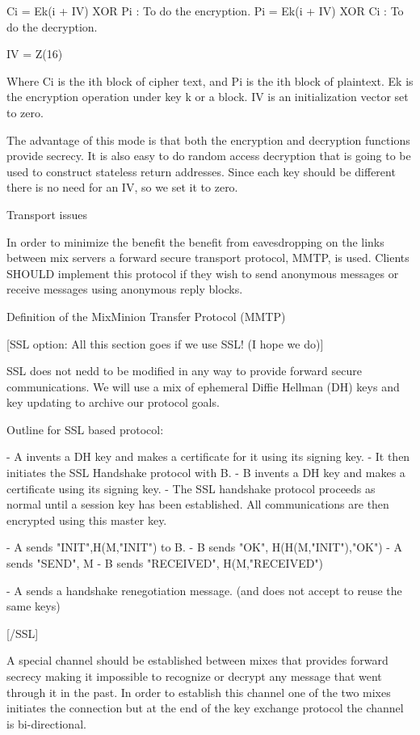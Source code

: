 Ci = Ek(i + IV) XOR Pi  : To do the encryption.
Pi = Ek(i + IV) XOR Ci  : To do the decryption.

IV = Z(16)

Where Ci is the ith block of cipher text, and Pi is the ith block of
plaintext. Ek is the encryption operation under key k or a block. IV
is an initialization vector set to zero.

The advantage of this mode is that both the encryption and decryption
functions provide secrecy. It is also easy to do random access
decryption that is going to be used to construct stateless return
addresses. Since each key should be different there is no need for an
IV, so we set it to zero. 

Transport issues

In order to minimize the benefit the benefit from eavesdropping on the links 
between mix servers a forward secure transport protocol, MMTP, is used. 
Clients SHOULD implement this protocol if they wish to send anonymous 
messages or receive messages using anonymous reply blocks.

Definition of the MixMinion Transfer Protocol (MMTP)

[SSL option: All this section goes if we use SSL! (I hope we do)]

SSL does not nedd to be modified in any way to provide forward secure
communications. We will use a mix of ephemeral Diffie Hellman (DH)
keys and key updating to archive our protocol goals.

Outline for SSL based protocol:

- A invents a DH key and makes a certificate for it using its signing key.
- It then initiates the SSL Handshake protocol with B.
- B invents a DH key and makes a certificate using its signing key.
- The SSL handshake protocol proceeds as normal until a session key
  has been established. All communications are then encrypted using
  this master key.

- A sends "INIT",H(M,"INIT") to B.
- B sends "OK", H(H(M,"INIT"),"OK")
- A sends "SEND", M
- B sends "RECEIVED", H(M,"RECEIVED")

- A sends a handshake renegotiation message.
  (and does not accept to reuse the same keys)

[/SSL]

A special channel should be established between mixes that provides forward 
secrecy making it impossible to recognize or decrypt any message that went 
through it in the past. In order to establish this channel one of the two mixes 
initiates the connection but at the end of the key exchange protocol the channel 
is bi-directional.

